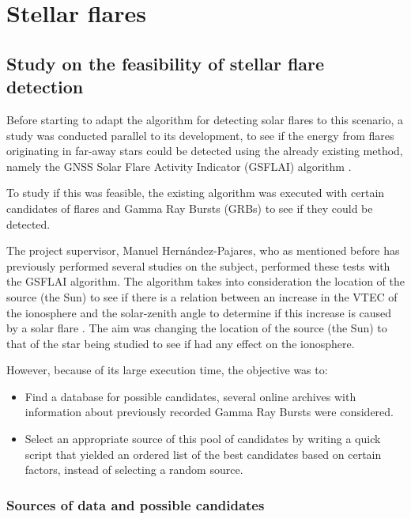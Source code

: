 \chapter{Stellar flares}

\section{Study on the feasibility of stellar flare detection}

Before starting to adapt the algorithm for detecting solar flares to this scenario, a study was conducted parallel to its development, to see if the energy from flares originating in far-away stars could be detected using the already existing method, namely the GNSS Solar Flare Activity Indicator (GSFLAI) algorithm \cite{hernandez2012gnss}.

To study if this was feasible, the existing algorithm was executed with certain candidates of flares and Gamma Ray Bursts (GRBs) to see if they could be detected.

The project supervisor, Manuel Hernández-Pajares, who as mentioned before has previously performed several studies on the subject, performed these tests with the GSFLAI algorithm. The algorithm takes into consideration the location of the source (the Sun) to see if there is a relation between an increase in the VTEC of the ionosphere and the solar-zenith angle to determine if this increase is caused by a solar flare \cite{hernandez2012gnss}. The aim was changing the location of the source (the Sun) to that of the star being studied to see if had any effect on the ionosphere.

However, because of its large execution time, the objective was to:

\begin{itemize}
	\item Find a database for possible candidates, several online archives with information about previously recorded Gamma Ray Bursts were considered.
	\item Select an appropriate source of this pool of candidates by writing a quick script that yielded an ordered list of the best candidates based on certain factors, instead of selecting a random source.
\end{itemize}

\subsection{Sources of data and possible candidates}

